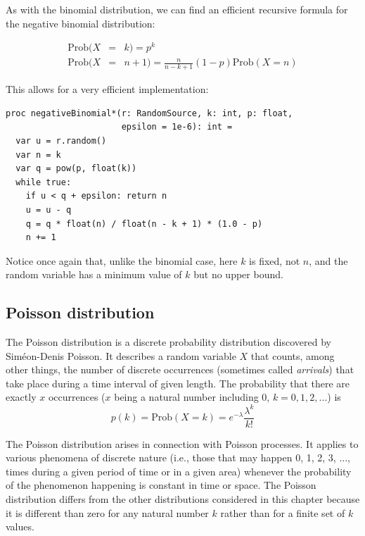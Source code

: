 \documentclass[justified, sixbynine]{tufte-book}
\def\ft{\small\tt}
\theoremstyle{plain}%
\newtheorem * {corollary}{Corollary}
\theoremstyle{definition}
\theoremstyle{remark}
\newtheorem * {remark}{Remark}
\newtheorem * {note}{Note}
\begin{document}
\begin{fullwidth}
As with the binomial distribution, we can find an efficient recursive formula for the
negative binomial distribution:

\begin{eqnarray}
\textrm{Prob}(X &=& k) = p^k \\
\textrm{Prob}(X &=& n+1)=\frac{n}{n-k+1}(1-p)\textrm{Prob}(X=n)
\end{eqnarray}

This allows for a very efficient implementation:

\begin{lstlisting}[caption={in file: {\ft nlib/randomgen.nim}}]
proc negativeBinomial*(r: RandomSource, k: int, p: float,
                       epsilon = 1e-6): int =
  var u = r.random()
  var n = k
  var q = pow(p, float(k))
  while true:
    if u < q + epsilon: return n
    u = u - q
    q = q * float(n) / float(n - k + 1) * (1.0 - p)
    n += 1
\end{lstlisting}

Notice once again that, unlike the binomial case, here $k$ is fixed, not $n$, and the random variable has a minimum value of $k$ but no upper bound.

\goodbreak\subsection{Poisson distribution}


The Poisson distribution is a discrete probability distribution discovered
by Sim\'{e}on-Denis Poisson. It describes a random variable
$X$ that counts, among other things, the number of
discrete occurrences (sometimes called {\it arrivals}) that take place during
a time interval of given length. The probability that there are exactly $x$
occurrences ($x$ being a natural number including 0, $k=0, 1, 2, ...$) is
\begin{equation}
p(k)=\textrm{Prob}(X=k)=e^{-\lambda }\frac{\lambda ^k}{k!}
\end{equation}

The Poisson distribution arises in connection with Poisson processes. It
applies to various phenomena of discrete nature (i.e., those that may
happen 0, 1, 2, 3, ..., times during a given period of time or in a given
area) whenever the probability of the phenomenon happening is constant in
time or space. The Poisson distribution differs from the other distributions
considered in this chapter because it is different than zero for any natural
number $k$ rather than for a finite set of $k$ values.


\end{fullwidth}
\end{document}

